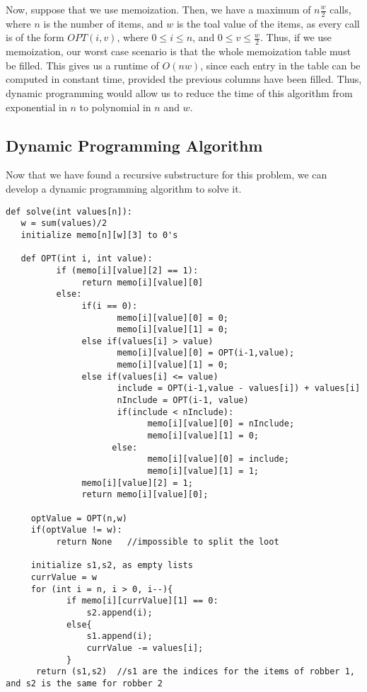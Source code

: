 \documentclass{article}
\begin{document}
Now, suppose that we use memoization.  Then, we have a maximum of $n\frac{w}{2}$ calls, where $n$ is the number of items, and $w$ is the toal value of the items, as every call is of the form $OPT(i,v)$, where $0 \leq i \leq n$, and $0 \leq v \leq \frac{w}{2}$.  Thus, if we use memoization, our worst case scenario is that the whole memoization table must be filled.  This gives us a runtime of $O(nw)$, since each entry in the table can be computed in constant time, provided the previous columns have been filled.  Thus, dynamic programming would allow us to reduce the time of this algorithm from exponential in $n$ to polynomial in $n$ and $w$.

\newpage

\subsection{Dynamic Programming Algorithm}

Now that we have found a recursive substructure for this problem, we can develop a dynamic programming algorithm to solve it.  

\begin{verbatim}
def solve(int values[n]):
   w = sum(values)/2
   initialize memo[n][w][3] to 0's
   
   def OPT(int i, int value):
          if (memo[i][value][2] == 1):
               return memo[i][value][0]
          else:
               if(i == 0):
                      memo[i][value][0] = 0;
                      memo[i][value][1] = 0;
               else if(values[i] > value)
                      memo[i][value][0] = OPT(i-1,value);
                      memo[i][value][1] = 0;
               else if(values[i] <= value)
                      include = OPT(i-1,value - values[i]) + values[i]
                      nInclude = OPT(i-1, value)
                      if(include < nInclude):
                            memo[i][value][0] = nInclude;
                            memo[i][value][1] = 0;
                     else:
                            memo[i][value][0] = include;
                            memo[i][value][1] = 1;
               memo[i][value][2] = 1;
               return memo[i][value][0];

     optValue = OPT(n,w)
     if(optValue != w):
          return None   //impossible to split the loot

     initialize s1,s2, as empty lists
     currValue = w
     for (int i = n, i > 0, i--){
            if memo[i][currValue][1] == 0:
                s2.append(i);
            else{
                s1.append(i);
                currValue -= values[i];
            }
      return (s1,s2)  //s1 are the indices for the items of robber 1, and s2 is the same for robber 2

\end{verbatim}
\end{document}
